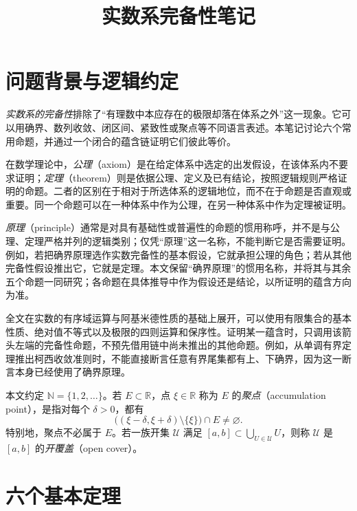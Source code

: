 \documentclass[UTF8,12pt,a4paper,fontset=fandol]{ctexart}
\title{实数系完备性笔记}
\author{}
\date{}
\begin{document}

\maketitle
\tableofcontents
\clearpage

\section{问题背景与逻辑约定}

\emph{实数系的完备性}排除了“有理数中本应存在的极限却落在体系之外”这一现象。它可以用确界、数列收敛、闭区间、紧致性或聚点等不同语言表述。本笔记讨论六个常用命题，并通过一个闭合的蕴含链证明它们彼此等价。

\begin{whispers}
在数学理论中，{\upshape\emph{公理}}（axiom）是在给定体系中选定的出发假设，在该体系内不要求证明；{\upshape\emph{定理}}（theorem）则是依据公理、定义及已有结论，按照逻辑规则严格证明的命题。二者的区别在于相对于所选体系的逻辑地位，而不在于命题是否直观或重要。同一个命题可以在一种体系中作为公理，在另一种体系中作为定理被证明。

{\upshape\emph{原理}}（principle）通常是对具有基础性或普遍性的命题的惯用称呼，并不是与公理、定理严格并列的逻辑类别；仅凭“原理”这一名称，不能判断它是否需要证明。例如，若把确界原理选作实数完备性的基本假设，它就承担公理的角色；若从其他完备性假设推出它，它就是定理。本文保留“确界原理”的惯用名称，并将其与其余五个命题一同研究；各命题在具体推导中作为假设还是结论，以所证明的蕴含方向为准。
\end{whispers}

全文在实数的有序域运算与阿基米德性质的基础上展开，可以使用有限集合的基本性质、绝对值不等式以及极限的四则运算和保序性。证明某一蕴含时，只调用该箭头左端的完备性命题，不预先借用链中尚未推出的其他命题。例如，从单调有界定理推出柯西收敛准则时，不能直接断言任意有界尾集都有上、下确界，因为这一断言本身已经使用了确界原理。

本文约定 $\mathbb N=\{1,2,\ldots\}$。若 $E\subset\mathbb R$，点 $\xi\in\mathbb R$ 称为 $E$ 的\emph{聚点}（accumulation point），是指对每个 $\delta>0$，都有
\[
  \bigl((\xi-\delta,\xi+\delta)\setminus\{\xi\}\bigr)\cap E\ne\varnothing.
\]
特别地，聚点不必属于 $E$。若一族开集 $\mathcal U$ 满足 $[a,b]\subset\bigcup_{U\in\mathcal U}U$，则称 $\mathcal U$ 是 $[a,b]$ 的\emph{开覆盖}（open cover）。

\section{六个基本定理}
\end{document}
